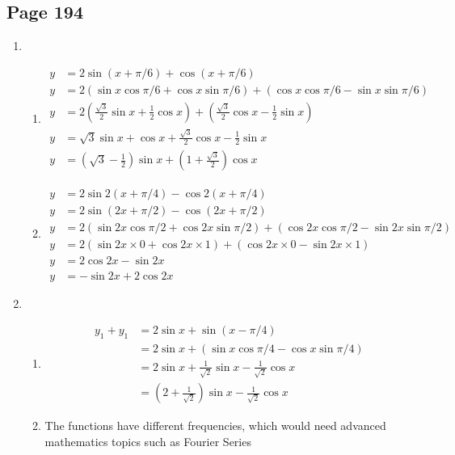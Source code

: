\documentclass{article}
\newenvironment{solutions}[1]
{\subsection*{#1}
 \begin{enumerate}[leftmargin=1.5em]}
{\end{enumerate}}
\newcommand{\solution}{\item}
\newenvironment{subsolutions}
{\begin{enumerate}}
{\end{enumerate}}
\newcommand{\subsolution}{\item}
\begin{document}
\begin{solutions}{Page 194}
\solution
\begin{subsolutions}

\subsolution
\begin{align*}
    y&= 2\sin(x+\pi/6) + \cos(x+\pi/6)\\
    y&= 2\left(\sin x \cos \pi/6 + \cos x \sin \pi/6 \right) + \left( \cos x \cos \pi/6 - \sin x \sin \pi/6 \right)\\
    y&= 2\left(\frac{\sqrt{3}}{2}\sin x+ \frac{1}{2}\cos x \right) + \left(\frac{\sqrt{3}}{2} \cos x -\frac{1}{2} \sin x\right)\\
    y&= \sqrt{3}\sin x + \cos x +\frac{\sqrt{3}}{2} \cos x -\frac{1}{2} \sin x\\
    y&= \left(\sqrt{3} -\frac{1}{2} \right)\sin x + \left(1 + \frac{\sqrt{3}}{2}\right) \cos x
\end{align*}

\subsolution
\begin{align*}
    y&= 2\sin2(x+\pi/4) - \cos2(x+\pi/4)\\
    y&= 2\sin(2x+\pi/2) - \cos(2x+\pi/2)\\
    y&= 2\left(\sin 2x \cos \pi/2 + \cos 2x \sin \pi/2 \right) + \left( \cos 2x \cos \pi/2 - \sin 2x \sin \pi/2 \right)\\
    y&= 2\left(\sin 2x \times 0 + \cos 2x \times 1\right) + \left( \cos 2x \times 0 - \sin 2x \times 1 \right)\\
    y&= 2\cos 2x -\sin 2x\\
    y&= -\sin 2x + 2\cos 2x
\end{align*}
\end{subsolutions}

\solution
\begin{subsolutions}
\subsolution
\begin{align*}
    y_1 + y_1 &= 2\sin x + \sin (x-\pi/4)\\
              &= 2\sin x + \left(\sin x  \cos \pi/4 - \cos x \sin \pi/4 \right)\\
              &= 2\sin x + \frac{1}{\sqrt{2}}\sin x - \frac{1}{\sqrt{2}}\cos x\\
              &= \left(2+ \frac{1}{\sqrt{2}} \right)\sin x - \frac{1}{\sqrt{2}} \cos x
\end{align*}

\subsolution
The functions have different frequencies, which would need advanced mathematics topics such as Fourier Series
\end{subsolutions}
\end{solutions}
\end{document}
